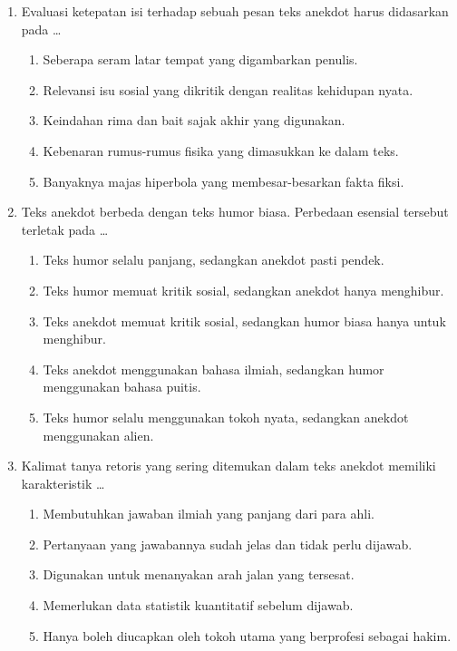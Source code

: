 \documentclass[12pt,a4paper]{article}
\begin{document}
\begin{enumerate}[leftmargin=*]
\item Evaluasi ketepatan isi terhadap sebuah pesan teks anekdot harus didasarkan pada \dots
    \begin{enumerate}[label=\alph*.]
        \item Seberapa seram latar tempat yang digambarkan penulis.
        \item Relevansi isu sosial yang dikritik dengan realitas kehidupan nyata.
        \item Keindahan rima dan bait sajak akhir yang digunakan.
        \item Kebenaran rumus-rumus fisika yang dimasukkan ke dalam teks.
        \item Banyaknya majas hiperbola yang membesar-besarkan fakta fiksi.
    \end{enumerate}

\item Teks anekdot berbeda dengan teks humor biasa. Perbedaan esensial tersebut terletak pada \dots
    \begin{enumerate}[label=\alph*.]
        \item Teks humor selalu panjang, sedangkan anekdot pasti pendek.
        \item Teks humor memuat kritik sosial, sedangkan anekdot hanya menghibur.
        \item Teks anekdot memuat kritik sosial, sedangkan humor biasa hanya untuk menghibur.
        \item Teks anekdot menggunakan bahasa ilmiah, sedangkan humor menggunakan bahasa puitis.
        \item Teks humor selalu menggunakan tokoh nyata, sedangkan anekdot menggunakan alien.
    \end{enumerate}

\item Kalimat tanya retoris yang sering ditemukan dalam teks anekdot memiliki karakteristik \dots
    \begin{enumerate}[label=\alph*.]
        \item Membutuhkan jawaban ilmiah yang panjang dari para ahli.
        \item Pertanyaan yang jawabannya sudah jelas dan tidak perlu dijawab.
        \item Digunakan untuk menanyakan arah jalan yang tersesat.
        \item Memerlukan data statistik kuantitatif sebelum dijawab.
        \item Hanya boleh diucapkan oleh tokoh utama yang berprofesi sebagai hakim.
    \end{enumerate}


\end{enumerate}
\end{document}
